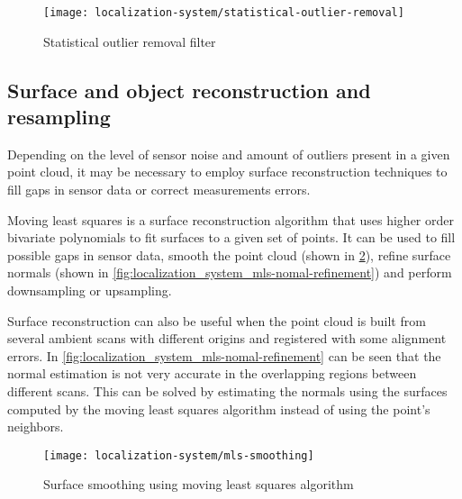 \begin{figure}[H]
	\centering
	\texttt{[image: localization-system/statistical-outlier-removal]}
	\caption[Statistical outlier removal filter]{Statistical outlier removal filter\protect\footnotemark}
	\label{fig:localization_system_statistical-outlier-removal}
\end{figure}


\subsection{Surface and object reconstruction and resampling}\label{subsec:localization_system_surface-reconstruction-resampling}

Depending on the level of sensor noise and amount of outliers present in a given point cloud, it may be necessary to employ surface reconstruction techniques to fill gaps in sensor data or correct measurements errors.

Moving least squares \cite{Alexa2003} is a surface reconstruction algorithm that uses higher order bivariate polynomials to fit surfaces to a given set of points. It can be used to fill possible gaps in sensor data, smooth the point cloud (shown in \cref{fig:localization_system_mls-smoothing}), refine surface normals (shown in \cref{fig:localization_system_mls-nomal-refinement}) and perform downsampling or upsampling.

Surface reconstruction can also be useful when the point cloud is built from several ambient scans with different origins and registered with some alignment errors. In \cref{fig:localization_system_mls-nomal-refinement} can be seen that the normal estimation is not very accurate in the overlapping regions between different scans. This can be solved by estimating the normals using the surfaces computed by the moving least squares algorithm instead of using the point's neighbors.


\begin{figure}[H]
	\centering
	\texttt{[image: localization-system/mls-smoothing]}
	\caption[Surface smoothing using moving least squares algorithm]{Surface smoothing using moving least squares algorithm\protect\footnotemark}
	\label{fig:localization_system_mls-smoothing}
\end{figure}

